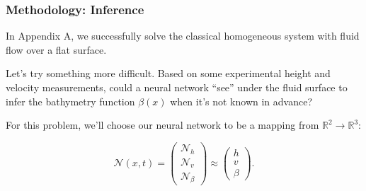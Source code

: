 \begin{frame}
    \frametitle{Methodology: Inference}

    In Appendix A, we successfully solve the classical homogeneous system with fluid flow over a flat surface.

    \bigskip
    \pause
    
    Let's try something more difficult. Based on some experimental height and velocity measurements, could a neural 
    network ``see'' under the fluid surface to infer the bathymetry function $\beta(x)$ when it's not known in advance?

    \bigskip
    \pause

    For this problem, we'll choose our neural network to be a mapping from 
    $\mathbb{R}^2 \to \mathbb{R}^3$:

    $$
    \mathcal{N}(x, t) = \begin{pmatrix*}
        \mathcal{N}_h \\
        \mathcal{N}_v \\
        \mathcal{N}_{\beta}
    \end{pmatrix*} \approx \begin{pmatrix*}
        h \\
        v \\
        \beta
    \end{pmatrix*}.
    $$
\end{frame}
